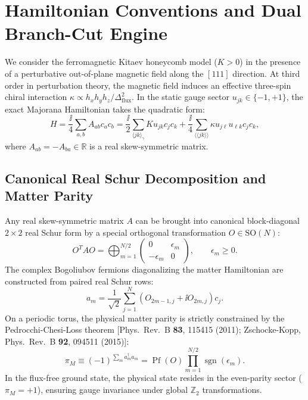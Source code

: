 \section{Hamiltonian Conventions and Dual Branch-Cut Engine}
\label{sec:p3_hamiltonian_and_cuts}

We consider the ferromagnetic Kitaev honeycomb model ($K > 0$) in the presence of a perturbative out-of-plane magnetic field along the $[111]$ direction. At third order in perturbation theory, the magnetic field induces an effective three-spin chiral interaction $\kappa \propto h_x h_y h_z / \Delta_{\mathrm{flux}}^2$. In the static gauge sector $u_{jk} \in \{-1, +1\}$, the exact Majorana Hamiltonian takes the quadratic form:
\begin{equation}
\label{eq:p3_chiral_hamiltonian}
H = \frac{\ii}{4} \sum_{a, b} A_{ab} c_a c_b = \frac{\ii}{2} \sum_{\langle jk \rangle_\gamma} K u_{jk} c_j c_k + \frac{\ii}{4} \sum_{\langle\langle j k \rangle\rangle} \kappa u_{j\ell} u_{\ell k} c_j c_k,
\end{equation}
where $A_{ab} = -A_{ba} \in \mathbb{R}$ is a real skew-symmetric matrix.

\subsection{Canonical Real Schur Decomposition and Matter Parity}
Any real skew-symmetric matrix $A$ can be brought into canonical block-diagonal $2 \times 2$ real Schur form by a special orthogonal transformation $O \in \mathrm{SO}(N)$:
\begin{equation}
O^T A O = \bigoplus_{m=1}^{N/2} \begin{pmatrix} 0 & \epsilon_m \\ -\epsilon_m & 0 \end{pmatrix}, \qquad \epsilon_m \ge 0.
\end{equation}
The complex Bogoliubov fermions diagonalizing the matter Hamiltonian are constructed from paired real Schur rows:
\begin{equation}
a_m = \frac{1}{\sqrt{2}} \sum_{j=1}^N \left( O_{2m-1, j} + \ii O_{2m, j} \right) c_j.
\end{equation}
On a periodic torus, the physical matter parity is strictly constrained by the Pedrocchi-Chesi-Loss theorem [Phys.~Rev.~B \textbf{83}, 115415 (2011); Zschocke-Kopp, Phys.~Rev.~B \textbf{92}, 094511 (2015)]:
\begin{equation}
\label{eq:p3_matter_parity_pedrocchi}
\pi_M \equiv (-1)^{\sum_m a_m^\dagger a_m} = \operatorname{Pf}(O) \prod_{m=1}^{N/2} \operatorname{sgn}(\epsilon_m).
\end{equation}
In the flux-free ground state, the physical state resides in the even-parity sector ($\pi_M = +1$), ensuring gauge invariance under global $\mathbb{Z}_2$ transformations.

